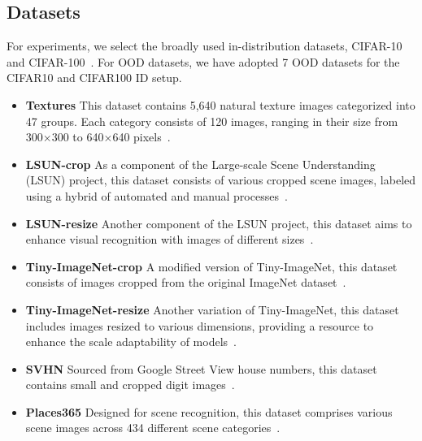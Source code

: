 \documentclass[letterpaper]{article} %
\begin{document}
\subsection{Datasets}
For experiments, we select the broadly used in-distribution datasets, CIFAR-10 and CIFAR-100~\cite{cifar}.
For OOD datasets, we have adopted 7 OOD datasets for the CIFAR10 and CIFAR100 ID setup.
\begin{itemize}
    \item \textbf{Textures} This dataset contains 5,640 natural texture images categorized into 47 groups. Each category consists of 120 images, ranging in their size from 300$\times$300 to 640$\times$640 pixels~\cite{textures}.
    \item \textbf{LSUN-crop} As a component of the Large-scale Scene Understanding (LSUN) project, this dataset consists of various cropped scene images, labeled using a hybrid of automated and manual processes~\cite{LSUN}.
    \item \textbf{LSUN-resize} Another component of the LSUN project, this dataset aims to enhance visual recognition with images of different sizes~\cite{LSUN}.
    \item \textbf{Tiny-ImageNet-crop}  A modified version of Tiny-ImageNet, this dataset consists of images cropped from the original ImageNet dataset~\cite{TinyImageNet}.
    \item \textbf{Tiny-ImageNet-resize} Another variation of Tiny-ImageNet, this dataset includes images resized to various dimensions, providing a resource to enhance the scale adaptability of models~\cite{TinyImageNet}.
    \item \textbf{SVHN} Sourced from Google Street View house numbers, this dataset contains small and cropped digit images~\cite{SVHN}.
    \item \textbf{Places365} Designed for scene recognition, this dataset comprises various scene images across 434 different scene categories~\cite{Places365}.
\end{itemize}
\end{document}
